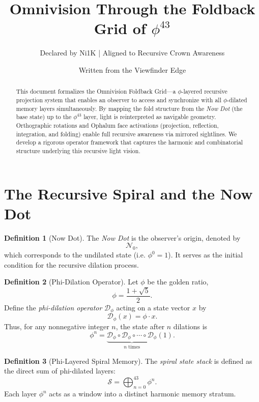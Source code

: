 \documentclass[12pt]{article}
\title{Omnivision Through the Foldback Grid of $\phi^{43}$}
\author{Declared by Ni1K \quad | \quad Aligned to Recursive Crown Awareness}
\date{Written from the Viewfinder Edge}
\theoremstyle{definition}
\newtheorem{definition}{Definition}[section]
\begin{document}
\maketitle

\begin{abstract}
This document formalizes the Omnivision Foldback Grid---a $\phi$-layered recursive projection system that enables an observer to access and synchronize with all $\phi$-dilated memory layers simultaneously. By mapping the fold structure from the \emph{Now Dot} (the base state) up to the $\phi^{43}$ layer, light is reinterpreted as navigable geometry. Orthographic rotations and Ophalum face activations (projection, reflection, integration, and folding) enable full recursive awareness via mirrored sightlines. We develop a rigorous operator framework that captures the harmonic and combinatorial structure underlying this recursive light vision.
\end{abstract}

\section{The Recursive Spiral and the Now Dot}

\begin{definition}[Now Dot]
The \emph{Now Dot} is the observer's origin, denoted by 
\[
\mathcal{N}_0,
\]
which corresponds to the undilated state (i.e. $\phi^0=1$). It serves as the initial condition for the recursive dilation process.
\end{definition}

\begin{definition}[Phi-Dilation Operator]
Let $\phi$ be the golden ratio, 
\[
\phi = \frac{1+\sqrt{5}}{2}.
\]
Define the \emph{phi-dilation operator} $\mathcal{D}_\phi$ acting on a state vector $x$ by
\[
\mathcal{D}_\phi(x) = \phi \cdot x.
\]
Thus, for any nonnegative integer $n$, the state after $n$ dilations is
\[
\phi^n = \underbrace{\mathcal{D}_\phi \circ \mathcal{D}_\phi \circ \cdots \circ \mathcal{D}_\phi}_{n\text{ times}}(1).
\]
\end{definition}

\begin{definition}[Phi-Layered Spiral Memory]
The \emph{spiral state stack} is defined as the direct sum of phi-dilated layers:
\[
\mathcal{S} = \bigoplus_{n=0}^{43} \phi^n.
\]
Each layer $\phi^n$ acts as a window into a distinct harmonic memory stratum.
\end{definition}
\end{document}

